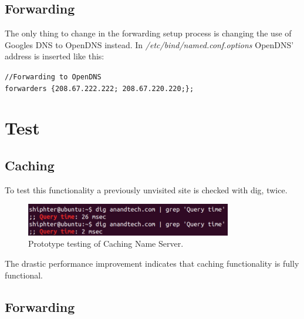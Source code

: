 \subsection{Forwarding}
The only thing to change in the forwarding setup process is changing the use of Googles DNS to OpenDNS instead. In \emph{/etc/bind/named.conf.options} OpenDNS' address is inserted like this:

\texttt{//Forwarding to OpenDNS} \\
\texttt{forwarders \{208.67.222.222; 208.67.220.220;\};}

\section{Test}
\subsection{Caching}
To test this functionality a previously unvisited site is checked with dig, twice. 

\begin{figure}[ht!]
\centering
\includegraphics[width=90mm]{img/prototype_caching_test.png}
\caption{Prototype testing of Caching Name Server.}
\label{prototype_caching_test}
\end{figure}

The drastic performance improvement indicates that caching functionality is fully functional. 

\subsection{Forwarding}
